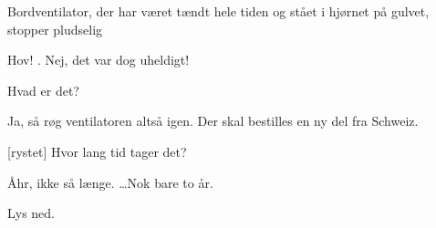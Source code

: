 \documentclass[a4paper,12pt]{article}
\begin{document}
\begin{sketch}
\scene Bordventilator, der har været tændt hele tiden og stået i hjørnet på gulvet, stopper pludselig

 Hov! . Nej, det var dog uheldigt!

 Hvad er det?

 Ja, så røg ventilatoren altså igen. Der skal bestilles en ny del fra Schweiz. 

[rystet] Hvor lang tid tager det? 

 Åhr, ikke så længe.  \ldots Nok bare to år.

\scene Lys ned.





\end{sketch}
\end{document}
